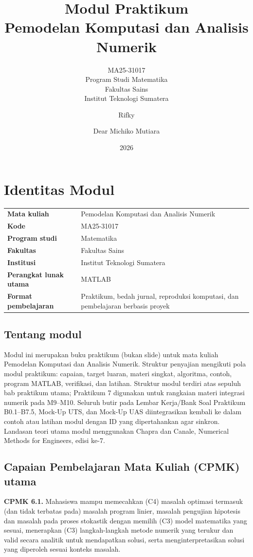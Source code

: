 \documentclass[book,english,noindex,lean,nobackpage,nocopyright,noupdate,nofiglist,notablist]{enacom}
\title{Modul Praktikum\\Pemodelan Komputasi dan Analisis Numerik}
\subtitle{MA25-31017\\Program Studi Matematika\\Fakultas Sains\\Institut Teknologi Sumatera}
\author{Rifky}{Fauzi}
\author{Dear Michiko Mutiara}{Noor}
\date{2026}
\begin{document}
\chapter*{Identitas Modul}
\begin{tabularx}{\textwidth}{>{\bfseries}p{}X}
Mata kuliah & Pemodelan Komputasi dan Analisis Numerik\\
Kode & MA25-31017\\
Program studi & Matematika\\
Fakultas & Fakultas Sains\\
Institusi & Institut Teknologi Sumatera\\
Perangkat lunak utama & MATLAB\\
Format pembelajaran & Praktikum, bedah jurnal, reproduksi komputasi, dan pembelajaran berbasis proyek\\
\end{tabularx}

\section*{Tentang modul}
Modul ini merupakan buku praktikum (bukan slide) untuk mata kuliah Pemodelan Komputasi dan Analisis Numerik. Struktur penyajian mengikuti pola modul praktikum: capaian, target luaran, materi singkat, algoritma, contoh, program MATLAB, verifikasi, dan latihan. Struktur modul terdiri atas sepuluh bab praktikum utama; Praktikum 7 digunakan untuk rangkaian materi integrasi numerik pada M9--M10. Seluruh butir pada Lembar Kerja/Bank Soal Praktikum B0.1--B7.5, Mock-Up UTS, dan Mock-Up UAS diintegrasikan kembali ke dalam contoh atau latihan modul dengan ID yang dipertahankan agar sinkron. Landasan teori utama modul menggunakan Chapra dan Canale, Numerical Methods for Engineers, edisi ke-7.

\section*{Capaian Pembelajaran Mata Kuliah (CPMK) utama}
\textbf{CPMK 6.1.} Mahasiswa mampu memecahkan (C4) masalah optimasi termasuk (dan tidak terbatas pada) masalah program linier, masalah pengujian hipotesis dan masalah pada proses stokastik dengan memilih (C3) model matematika yang sesuai, menerapkan (C3) langkah-langkah metode numerik yang terukur dan valid secara analitik untuk mendapatkan solusi, serta menginterpretasikan solusi yang diperoleh sesuai konteks masalah.
\end{document}
